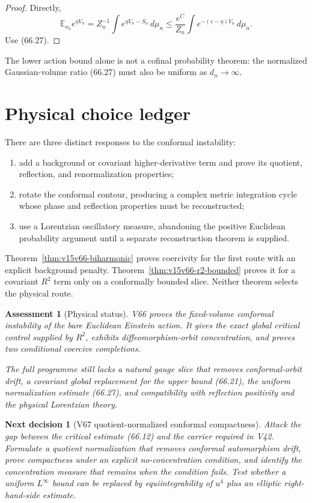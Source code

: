 \documentclass[11pt]{article}
\newtheorem{decision}[theorem]{Next decision}
\newtheorem{assessment}[theorem]{Assessment}
\theoremstyle{remark}
\begin{document}
\begin{proof}
Directly,
\[
 \mathbb E_{\nu_n}e^{\eta V_n}
 =
 Z_n^{-1}\int e^{\eta V_n-S_n}\,d\mu_n
 \leq
 \frac{e^C}{Z_n}
 \int e^{-(c-\eta)V_n}\,d\mu_n.
\]
Use (66.27).
\end{proof}

The lower action bound alone is not a cofinal probability theorem:
the normalized Gaussian-volume ratio (66.27) must also be uniform
as \(d_n\to\infty\).

\section{Physical choice ledger}

There are three distinct responses to the conformal instability:
\begin{enumerate}
\item add a background or covariant higher-derivative term and
      prove its quotient, reflection, and renormalization
      properties;
\item rotate the conformal contour, producing a complex metric
      integration cycle whose phase and reflection properties must
      be reconstructed;
\item use a Lorentzian oscillatory measure, abandoning the positive
      Euclidean probability argument until a separate
      reconstruction theorem is supplied.
\end{enumerate}
Theorem~\ref{thm:v15v66-biharmonic} proves coercivity for the first
route with an explicit background penalty.
Theorem~\ref{thm:v15v66-r2-bounded} proves it for a covariant
\(R^2\) term only on a conformally bounded slice.  Neither theorem
selects the physical route.

\begin{assessment}[Physical status]
\label{ass:v15v66-status}
V66 proves the fixed-volume conformal instability of the bare
Euclidean Einstein action.  It gives the exact global critical
control supplied by \(R^2\), exhibits diffeomorphism-orbit
concentration, and proves two conditional coercive completions.

The full programme still lacks a natural gauge slice that removes
conformal-orbit drift, a covariant global replacement for the
upper bound (66.21), the uniform normalization estimate (66.27),
and compatibility with reflection positivity and the physical
Lorentzian theory.
\end{assessment}

\begin{decision}[V67 quotient-normalized conformal compactness]
\label{dec:v15v66-next}
Attack the gap between the critical estimate (66.12) and the
carrier required in V42.  Formulate a quotient normalization that
removes conformal automorphism drift, prove compactness under an
explicit no-concentration condition, and identify the concentration
measure that remains when the condition fails.  Test whether a
uniform \(L^\infty\) bound can be replaced by equiintegrability of
\(u^4\) plus an elliptic right-hand-side estimate.
\end{decision}
\end{document}

